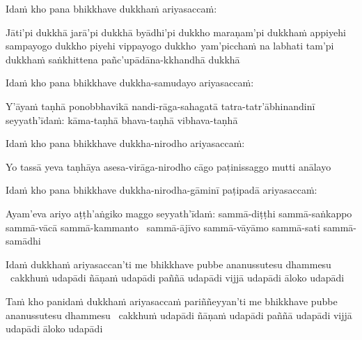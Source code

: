 \begin{pali-hang}
  Idaṁ kho pana bhikkhave dukkhaṁ ariyasaccaṁ:
\end{pali-hang}

\ifafive\clearpage\fi

\begin{pali-hang}
  Jāti'pi dukkhā jarā'pi dukkhā byādhi'pi dukkho maraṇam'pi dukkhaṁ \breathmark \thinspace appiyehi sampayogo dukkho piyehi vippayogo \mbox{dukkho}~\breathmark \thinspace yam'picchaṁ na labhati tam'pi dukkhaṁ  saṅkhittena pañc'upādāna-kkhandhā dukkhā
\end{pali-hang}

\begin{pali-hang}
  Idaṁ kho pana bhikkhave dukkha-samudayo ariyasaccaṁ:
\end{pali-hang}

\begin{pali-hang}
  Y'āyaṁ taṇhā ponobbhavikā nandi-rāga-sahagatā  tatra-tatr'ābhinandinī seyyath'īdaṁ: kāma-taṇhā bhava-taṇhā vibhava-taṇhā
\end{pali-hang}

\begin{pali-hang}
  Idaṁ kho pana bhikkhave dukkha-nirodho ariyasaccaṁ:
\end{pali-hang}

\begin{pali-hang}
  Yo tassā yeva taṇhāya asesa-virāga-nirodho cāgo paṭinissaggo mutti anālayo
\end{pali-hang}

\begin{pali-hang}
  Idaṁ kho pana bhikkhave dukkha-nirodha-gāminī paṭipadā ariyasaccaṁ:
\end{pali-hang}

\begin{pali-hang}
  Ayam'eva ariyo aṭṭh'aṅgiko maggo seyyath'īdaṁ: sammā-diṭṭhi sammā-saṅkappo sammā-vācā sammā-kammanto \breathmark\ sammā-ājīvo sammā-vāyāmo sammā-sati sammā-samādhi
\end{pali-hang}

\begin{pali-hang}
  Idaṁ dukkhaṁ ariyasaccan'ti me bhikkhave pubbe ananussutesu dhammesu \breathmark\ cakkhuṁ udapādi ñāṇaṁ udapādi paññā udapādi vijjā udapādi āloko udapādi
\end{pali-hang}

\begin{pali-hang}
  Taṁ kho panidaṁ dukkhaṁ ariyasaccaṁ pariññeyyan'ti me bhikkhave pubbe ananussutesu dhammesu \breathmark\ cakkhuṁ udapādi ñāṇaṁ udapādi paññā udapādi vijjā udapādi āloko udapādi
\end{pali-hang}

